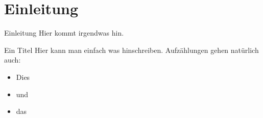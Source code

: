 \section{Einleitung}

\begin{frame}{Einleitung}
    Hier kommt irgendwas hin.
\end{frame}

\begin{frame}{Ein Titel}
    Hier kann man einfach was hinschreiben.
    Aufz\"ahlungen gehen nat\"urlich auch:
    \begin{itemize}
        \item Dies
        \item und
        \item das
    \end{itemize}
\end{frame}